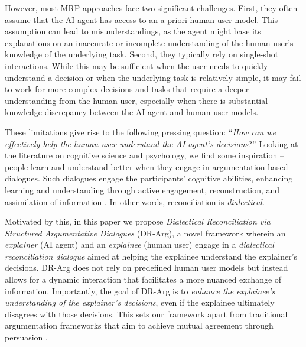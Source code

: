 \documentclass{article}
\begin{document}
However, most MRP approaches face two significant challenges. First, they often assume that the AI agent has access to an a-priori human user model. This assumption can lead to misunderstandings, as the agent might base its explanations on an inaccurate or incomplete understanding of the human user's knowledge of the underlying task. Second, they typically rely on single-shot interactions. While this may be sufficient when the user needs to quickly understand a decision or when the underlying task is relatively simple, it may fail to work for more complex decisions and tasks that require a deeper understanding from the human user, especially when there is substantial knowledge discrepancy between the AI agent and human user models.

These limitations give rise to the following pressing question: ``\textit{How can we effectively help the human user understand the AI agent's decisions}?'' Looking at the literature on cognitive science and psychology, we find some inspiration -- people learn and understand better when they engage in argumentation-based dialogues. Such dialogues engage the participants' cognitive abilities, enhancing learning and understanding through active engagement, reconstruction, and assimilation of information \cite{mercier2011humans}. In other words, reconciliation is \textit{dialectical}.



Motivated by this, in this paper we propose \textit{Dialectical Reconciliation via Structured Argumentative Dialogues} (DR-Arg), a novel framework wherein an \textit{explainer} (AI agent) and an \textit{explainee} (human user) engage in a \textit{dialectical reconciliation dialogue} aimed at helping the explainee understand the explainer's decisions. DR-Arg does not rely on predefined human user models but instead allows for a dynamic interaction that facilitates a more nuanced exchange of information. Importantly, the goal of DR-Arg is to \textit{enhance the explainee's understanding of the explainer's decisions}, even if the explainee ultimately disagrees with those decisions. This sets our framework apart from traditional argumentation frameworks that aim to achieve mutual agreement through persuasion \citep{gordon1994,prakken2006formal,parsons2003properties}.
\end{document}
